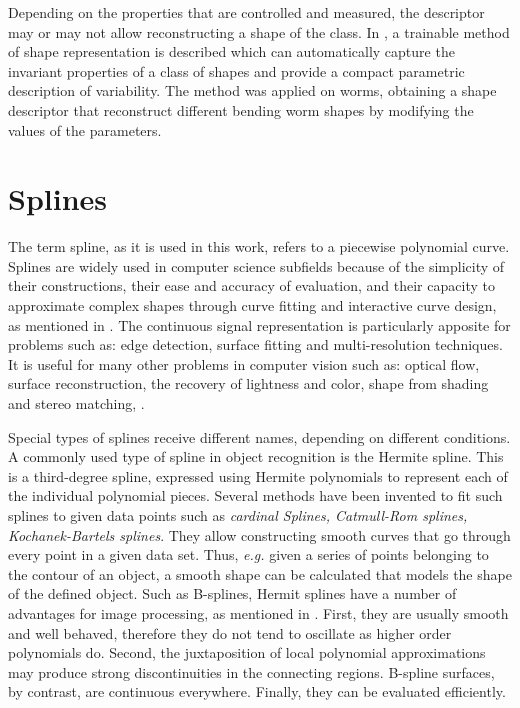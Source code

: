 Depending on the properties that are controlled and measured, the descriptor
may or may not allow reconstructing a shape of the class. In \cite{wormparam}, 
a trainable method of shape representation is described which can
automatically capture the invariant properties of a class of shapes and 
provide a compact parametric description of variability. The method was
applied on worms, obtaining a shape descriptor that reconstruct different
bending worm shapes by modifying the values of the parameters.\\

\section{Splines}
\label{sec:splines}

The term spline, as it is used in this work, refers to a piecewise polynomial curve. Splines
are widely used in computer science subfields because of the simplicity of their constructions,
their ease and accuracy of evaluation, and their capacity to approximate complex shapes
through curve fitting and interactive curve design, as mentioned in \cite{web:splines}.
The continuous signal representation is particularly apposite for 
problems such as: edge detection, surface fitting and multi-resolution
techniques. It is useful for many other problems in computer
vision such as: optical flow, surface reconstruction, the recovery
of lightness and color, shape from shading and stereo matching,
\cite[821]{splinespap}.

Special types of splines receive different names, depending on different conditions.\\
A commonly used type of spline in object recognition is the Hermite spline. This is a third-degree spline, expressed using Hermite polynomials to represent each of the 
individual polynomial pieces. 
Several methods have been invented to fit such splines to given data points such
as \emph{cardinal Splines, Catmull-Rom splines, Kochanek-Bartels splines}. They allow constructing smooth curves that go through every point in a given data set. Thus, \emph{e.g.} 
given a series of points belonging to the contour of an object, a smooth shape can be 
calculated that models the shape of the defined object.  
Such as B-splines, Hermit splines have a number of advantages for image processing, as
mentioned in \cite{splinespap}.
First, they are usually smooth and well behaved, therefore they do not tend to oscillate
as higher order polynomials do. Second, the juxtaposition of local polynomial approximations
may produce strong discontinuities in the connecting regions. B-spline
surfaces, by contrast, are continuous everywhere. 
Finally, they can be evaluated efficiently.
